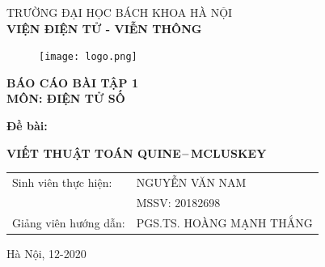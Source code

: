\documentclass[titlepage]{article} %
\begin{document}
\begin{titlepage}

\begin{center}\vspace{-10pt}
\textnormal{\fontsize{14pt}{0pt}\selectfont TRƯỜNG ĐẠI HỌC BÁCH KHOA HÀ NỘI \\}
\textbf{\fontsize{16pt}{0pt}\selectfont VIỆN ĐIỆN TỬ - VIỄN THÔNG}
\vspace{1.0cm}
\begin{figure}[H]
	\centering
	\texttt{[image: logo.png]}
\end{figure}
\vspace{2cm}
\textbf{\fontsize{20pt}{6pt}\selectfont BÁO CÁO BÀI TẬP 1} \\
    \textbf{\fontsize{20pt}{6pt}\selectfont MÔN: ĐIỆN TỬ SỐ}
    \end{center} \vspace{0.3cm}
    
\hspace{10pt} \textbf{\fontsize{16pt}{6pt}\selectfont Đề bài: } \vspace{-1em}
\begin{center} 
\textbf{\fontsize{20pt}{6pt}\selectfont VIẾT  THUẬT TOÁN QUINE$\--$MCLUSKEY}
\end{center}
\vspace{2.0cm}
\begin{center}
\begin{tabular}{ l l }
\fontsize{14pt}{0pt}\selectfont Sinh viên thực hiện: & \fontsize{14pt}{0pt}\selectfont NGUYỄN VĂN NAM   \\ 
  & \fontsize{14pt}{0pt}\selectfont MSSV: 20182698 \\   
\fontsize{14pt}{0pt}\selectfont Giảng viên hướng dẫn: &  \fontsize{14pt}{0pt}\selectfont  PGS.TS. HOÀNG MẠNH THẮNG
\end{tabular}
\end{center}
\vspace{3.5cm}
\fontsize{14pt}{0pt}\selectfont \centering Hà Nội, 12-2020
\end{titlepage}
\cleardoublepage
\end{document}
